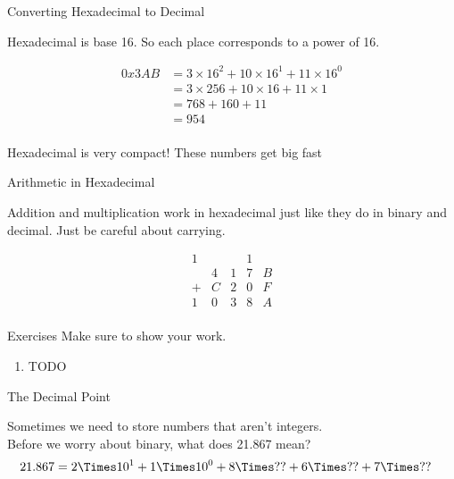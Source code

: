 \begin{frame}{Converting Hexadecimal to Decimal}

    Hexadecimal is base 16. So each place corresponds to a power of 16.

    \begin{align*}
        0x3AB & = 3 \times 16^2 + 10 \times 16^1 + 11 \times 16^0 \\
              & = 3 \times 256 + 10 \times 16 + 11 \times 1       \\
              & = 768 + 160 + 11                                  \\
              & = 954                                             \\
    \end{align*}

    Hexadecimal is very compact! These numbers get big fast

\end{frame}

\begin{frame}{Arithmetic in Hexadecimal}

    Addition and multiplication work in hexadecimal just like they do in binary and
    decimal. Just be careful about carrying.

    \[
        \begin{array}{ccccc}
            1 &   &   & 1 &   \\
              & 4 & 1 & 7 & B \\
            + & C & 2 & 0 & F \\
            \hline
            1 & 0 & 3 & 8 & A \\
        \end{array}
    \]

\end{frame}

\begin{frame}{Exercises}
    Make sure to show your work.
    \begin{enumerate}
        \item TODO
    \end{enumerate}
\end{frame}


\begin{frame}{The Decimal Point}

    Sometimes we need to store numbers that aren't integers. \\

    Before we worry about binary, what does 21.867 mean? \\

    \begin{align*}
        21.867 & = 2 \Times 10^1 + 1 \Times 10^0 + 8 \Times ?? + 6 \Times ?? + 7 \Times ??
    \end{align*}

\end{frame}

